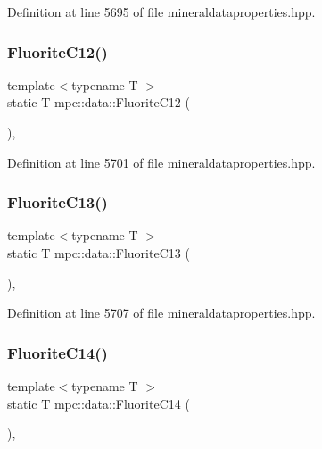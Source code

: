 Definition at line 5695 of file mineraldataproperties.\+hpp.

\mbox{\label{namespacempc_1_1data_a86055410ecfaa5bd13fad2d95937be3f}} 
\subsubsection{\texorpdfstring{Fluorite\+C12()}{FluoriteC12()}}
{\footnotesize\ttfamily template$<$typename T $>$ \\
static T mpc\+::data\+::\+Fluorite\+C12 (\begin{DoxyParamCaption}{ }\end{DoxyParamCaption})\hspace{0.3cm}{\ttfamily [inline]}, {\ttfamily [static]}}



Definition at line 5701 of file mineraldataproperties.\+hpp.

\mbox{\label{namespacempc_1_1data_a55f258a79775314f42baf957dbc91c14}} 
\subsubsection{\texorpdfstring{Fluorite\+C13()}{FluoriteC13()}}
{\footnotesize\ttfamily template$<$typename T $>$ \\
static T mpc\+::data\+::\+Fluorite\+C13 (\begin{DoxyParamCaption}{ }\end{DoxyParamCaption})\hspace{0.3cm}{\ttfamily [inline]}, {\ttfamily [static]}}



Definition at line 5707 of file mineraldataproperties.\+hpp.

\mbox{\label{namespacempc_1_1data_a706fc17cd2266416fc8713f908b0c087}} 
\subsubsection{\texorpdfstring{Fluorite\+C14()}{FluoriteC14()}}
{\footnotesize\ttfamily template$<$typename T $>$ \\
static T mpc\+::data\+::\+Fluorite\+C14 (\begin{DoxyParamCaption}{ }\end{DoxyParamCaption})\hspace{0.3cm}{\ttfamily [inline]}, {\ttfamily [static]}}



